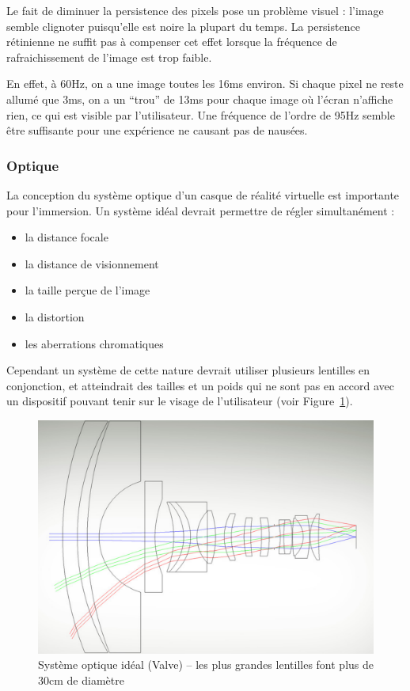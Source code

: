 \documentclass[a4,12pt]{scrartcl}
\begin{document}
Le fait de diminuer la persistence des pixels pose un problème visuel : l'image semble clignoter puisqu'elle est noire la plupart du temps. La persistence rétinienne ne suffit pas à compenser cet effet lorsque la fréquence de rafraichissement de l'image est trop faible.

En effet, à 60Hz, on a une image toutes les 16ms environ. Si chaque pixel ne reste allumé que 3ms, on a un “trou” de 13ms pour chaque image où l’écran n’affiche rien, ce qui est visible par l’utilisateur. Une fréquence de l’ordre de 95Hz semble être suffisante pour une expérience ne causant pas de nausées.


\subsubsection{Optique}

La conception du système optique d’un casque de réalité virtuelle est importante pour l’immersion. Un système idéal devrait permettre de régler simultanément : 
\begin{itemize}
	\item la distance focale
	\item la distance de visionnement
	\item la taille perçue de l’image
	\item la distortion
	\item les aberrations chromatiques
\end{itemize}

Cependant un système de cette nature devrait utiliser plusieurs lentilles en conjonction, et atteindrait des tailles et un poids qui ne sont pas en accord avec un dispositif pouvant tenir sur le visage de l’utilisateur (voir Figure~\ref{ideal-lens}).

\begin{figure}[H]
	\centering
	\includegraphics[width=0.6\linewidth]{lens}
	\caption{Système optique idéal (Valve) -- les plus grandes lentilles font plus de 30cm de diamètre}
	\label{ideal-lens}
\end{figure}
\end{document}
